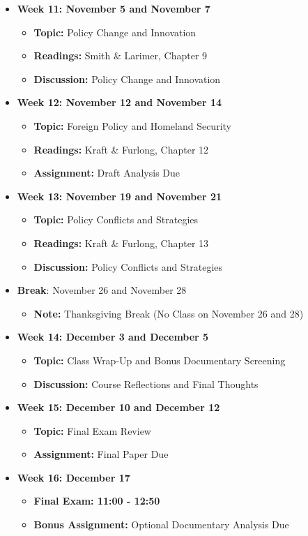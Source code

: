 \documentclass[12pt, letterpaper]{article}
\begin{document}
\begin{itemize}
    \item \textbf{Week 11: November 5 and November 7}
    \begin{itemize}
        \item \textbf{Topic:} Policy Change and Innovation
        \item \textbf{Readings:} Smith \& Larimer, Chapter 9
        \item \textbf{Discussion:} Policy Change and Innovation
    \end{itemize}

    \item \textbf{Week 12: November 12 and November 14}
    \begin{itemize}
        \item \textbf{Topic:} Foreign Policy and Homeland Security
        \item \textbf{Readings:} Kraft \& Furlong, Chapter 12
        \item \textbf{Assignment:} Draft Analysis Due
    \end{itemize}

    \item \textbf{Week 13: November 19 and November 21}
    \begin{itemize}
        \item \textbf{Topic:} Policy Conflicts and Strategies
        \item \textbf{Readings:} Kraft \& Furlong, Chapter 13
        \item \textbf{Discussion:} Policy Conflicts and Strategies
    \end{itemize}

    \item \textbf{Break}: November 26 and November 28
    \begin{itemize}
        \item \textbf{Note:} Thanksgiving Break (No Class on November 26 and 28)
    \end{itemize}

    \item \textbf{Week 14: December 3 and December 5}
    \begin{itemize}
        \item \textbf{Topic:} Class Wrap-Up and Bonus Documentary Screening 
        \item \textbf{Discussion:} Course Reflections and Final Thoughts
    \end{itemize}

    \item \textbf{Week 15: December 10 and December 12}
    \begin{itemize}
        \item \textbf{Topic:} Final Exam Review
        \item \textbf{Assignment:} Final Paper Due
    \end{itemize}

    \item \textbf{Week 16: December 17}
    \begin{itemize}
        \item \textbf{Final Exam: 11:00 - 12:50}
        \item \textbf{Bonus Assignment:} Optional Documentary Analysis Due

    \end{itemize}
\end{itemize}
\end{document}

